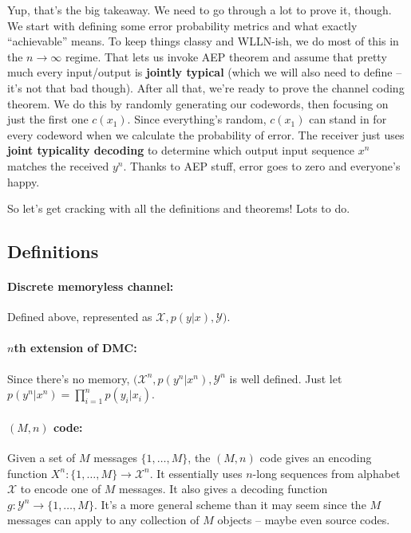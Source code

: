 \documentclass[a4paper,12pt]{report}
\begin{document}
Yup, that's the big takeaway. We need to go through a lot to prove it, though.
We start with defining some error probability metrics and what exactly
``achievable'' means. To keep things classy and WLLN-ish, we do most of this in
the $n\to \infty$ regime. That lets us invoke AEP theorem and assume that pretty
much every input/output is \textbf{jointly typical} (which we will also need to
define -- it's not that bad though). After all that, we're ready to prove the
channel coding theorem. We do this by randomly generating our codewords, then
focusing on just the first one $c(x_1)$. Since everything's random, $c(x_1)$ can
stand in for every codeword when we calculate the probability of error. The
receiver just uses \textbf{joint typicality decoding} to determine which output
input sequence $x^n$ matches the received $y^n$. Thanks to AEP stuff, error goes
to zero and everyone's happy.

So let's get cracking with all the definitions and theorems! Lots to do.






\subsection{Definitions}

\paragraph{Discrete memoryless channel: } Defined above, represented as
$\mathcal X, p(y | x), \mathcal Y)$.

\paragraph{$n$th extension of DMC: } Since there's no memory, $(\mathcal X^n,
p(y^n | x^n), \mathcal Y^n$ is well defined. Just let $p(y^n | x^n) =
\prod_{i=1}^n p(y_i | x_i)$.

\paragraph{$(M, n)$ code: } Given a set of $M$ messages $\{1, \dots, M\}$, the
$(M, n)$ code gives an encoding function $X^n: \{1, \dots, M\} \to \mathcal
X^n$. It essentially uses $n$-long sequences from alphabet $\mathcal X$ to
encode one of $M$ messages. It also gives a decoding function $g: \mathcal Y^n
\to \{1, \dots, M\}$. It's a more general scheme than it may seem since the $M$
messages can apply to any collection of $M$ objects -- maybe even source codes. 
\end{document}
